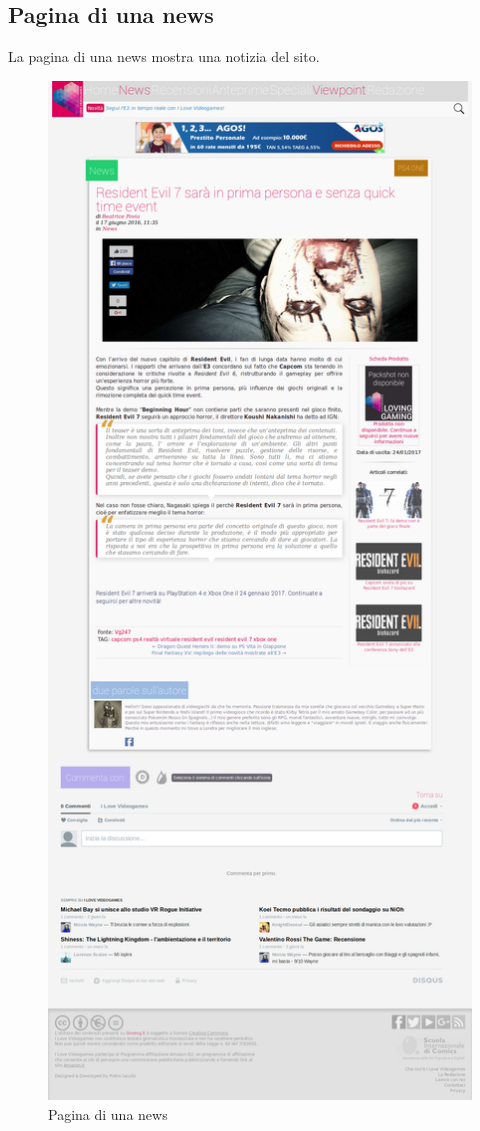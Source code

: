 \documentclass[../ProgettoTecWeb2.tex]{subfiles}
\begin{document}
	\subsection{Pagina di una news}
	La pagina di una news mostra una notizia del sito.
	\begin{figure} [H]
			\centering
			\includegraphics[scale=0.16]{img/NewsSingolaCompleta}
			\caption{Pagina di una news}
	\end{figure}
\end{document}
